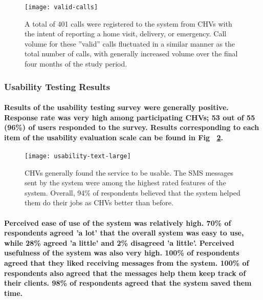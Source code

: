 \begin{figure}[h]
	\begin{center}
	\texttt{[image: valid-calls]}
	\end{center}
	\caption[Valid CHV Calls]{A total of 401 calls were registered to the system from CHVs with the intent of reporting a home visit, delivery, or emergency. Call volume for these ''valid'' calls fluctuated in a similar manner as the total number of calls, with generally increased volume over the final four months of the study period.}
	\label{fig:validCHVcalls}
\end{figure}

\subsubsection{Usability Testing Results}
\paragraph{Results of the usability testing survey were generally positive. Response rate was very high among participating CHVs; 53 out of 55 (96\%) of users responded to the survey. Results corresponding to each item of the usability evaluation scale can be found in Fig ~\ref{fig:barchart}.} 

\begin{figure}[h]
	\begin{center}
	\texttt{[image: usability-text-large]}
	\end{center}
	\caption[Usability survey results]{CHVs generally found the service to be usable. The SMS messages sent by the system were among the highest rated features of the system. Overall, 94\% of respondents believed that the system helped them do their jobs as CHVs better than before.}
	\label{fig:barchart}
\end{figure}

\paragraph{Perceived ease of use of the system was relatively high. 70\% of respondents agreed 'a lot' that the overall system was easy to use, while 28\%  agreed 'a little' and 2\%  disagreed 'a little'. Perceived usefulness of the system was also very high. 100\% of respondents agreed that they liked receiving messages from the system. 100\% of respondents also agreed that the messages help them keep track of their clients. 98\% of respondents agreed that the system saved them time.}

